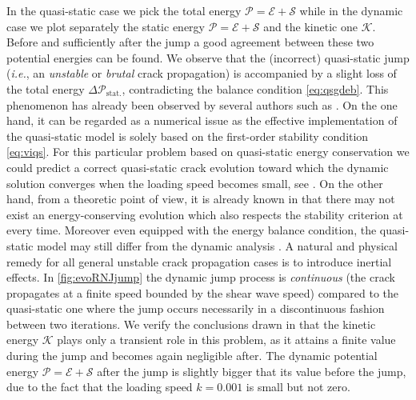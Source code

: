 In the quasi-static case we pick the total energy $\mathcal{P}=\mathcal{E}+\mathcal{S}$ while in the dynamic case we plot separately the static energy $\mathcal{P}=\mathcal{E}+\mathcal{S}$ and the kinetic one $\mathcal{K}$. Before and sufficiently after the jump a good agreement between these two potential energies can be found. We observe that the (incorrect) quasi-static jump (\emph{i.e.}, an \emph{unstable} or \emph{brutal} crack propagation) is accompanied by a slight loss of the total energy $\Delta \mathcal{P}_\mathrm{stat.}$, contradicting the balance condition \eqref{eq:qsgdeb}. This phenomenon has already been observed by several authors such as \cite{BourdinFrancfortMarigo:2008,AmorMarigoMaurini:2009,PhamAmorMarigoMaurini:2011,Bourdin:2011}. On the one hand, it can be regarded as a numerical issue as the effective implementation of the quasi-static model is solely based on the first-order stability condition \eqref{eq:viqs}. For this particular problem based on quasi-static energy conservation we could predict a correct quasi-static crack evolution toward which the dynamic solution converges when the loading speed becomes small, see \cite{DumouchelMarigoCharlotte:2008}. On the other hand, from a theoretic point of view, it is already known in \cite{Pham:2010} that there may not exist an energy-conserving evolution which also respects the stability criterion at every time. Moreover even equipped with the energy balance condition, the quasi-static model may still differ from the dynamic analysis \cite{LazzaroniBargelliniDumouchelMarigo:2012}. A natural and physical remedy for all general unstable crack propagation cases is to introduce inertial effects. In \cref{fig:evoRNJjump} the dynamic jump process is \emph{continuous} (the crack propagates at a finite speed bounded by the shear wave speed) compared to the quasi-static one where the jump occurs necessarily in a discontinuous fashion between two iterations. We verify the conclusions drawn in \cite{DumouchelMarigoCharlotte:2008} that the kinetic energy $\mathcal{K}$ plays only a transient role in this problem, as it attains a finite value during the jump and becomes again negligible after. The dynamic potential energy $\mathcal{P}=\mathcal{E}+\mathcal{S}$ after the jump is slightly bigger that its value before the jump, due to the fact that the loading speed $k=0.001$ is small but not zero.

